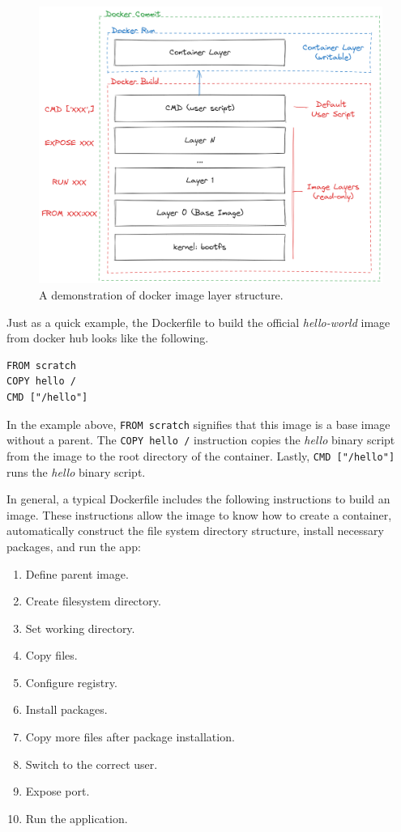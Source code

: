 \begin{figure}[!htb]
	\centering
	\includegraphics[width=350pt]{chapters/part-3/figures/dockerlayerdemo.png}
	\caption{A demonstration of docker image layer structure.} \label{ch:vac:fig:dockerlayerdemo}
\end{figure}

Just as a quick example, the Dockerfile to build the official \textit{hello-world} image from docker hub looks like the following.
\begin{lstlisting}
FROM scratch
COPY hello /
CMD ["/hello"]
\end{lstlisting}
In the example above, \verb|FROM scratch| signifies that this image is a base image without a parent. The \verb|COPY hello /| instruction copies the \textit{hello} binary script from the image to the root directory of the container. Lastly, \verb|CMD ["/hello"]| runs the \textit{hello} binary script.

In general, a typical Dockerfile includes the following instructions to build an image. These instructions allow the image to know how to create a container, automatically construct the file system directory structure, install necessary packages, and run the app:
\begin{enumerate}[(1)]
  \item Define parent image.
  \item Create filesystem directory.
  \item Set working directory.
  \item Copy files.
  \item Configure registry.
  \item Install packages.
  \item Copy more files after package installation.
  \item Switch to the correct user.
  \item Expose port.
  \item Run the application.
\end{enumerate}

